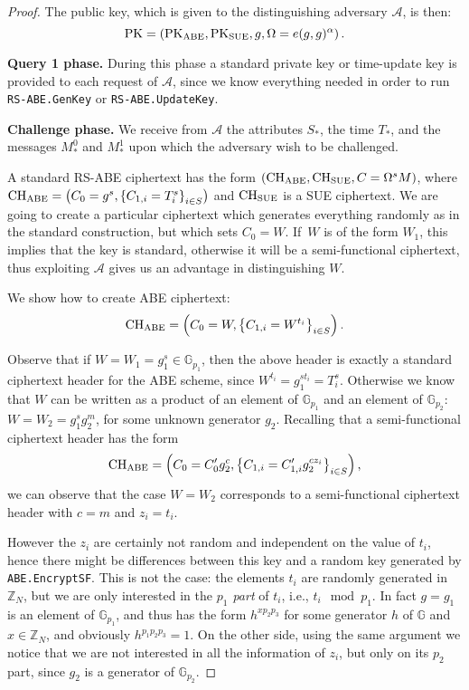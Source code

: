 \documentclass[a4paper,10pt]{article}
\newcommand{\G}{\mathbb{G}}
\newcommand{\Z}{\mathbb{Z}}
\newcommand{\algorithm}[2]{\texttt{#1.#2}}
\newcommand{\phase}[1]{\textbf{#1 phase.} \hspace{0pt}}
\begin{document}
\begin{proof}
	The public key, which is given to the distinguishing adversary $\mathcal{A}$, is then:
	\[
		\mathrm{PK}=\left( \mathrm{PK}_{\textnormal{ABE}}, \mathrm{PK}_{\textnormal{SUE}}, g, \Omega=e(g,g)^\alpha \right).
	\]
	
	\phase{Query 1}
	During this phase a standard private key or time-update key is provided to each request of $\mathcal{A}$, since we know everything needed in order to run \algorithm{RS-ABE}{GenKey} or \algorithm{RS-ABE}{UpdateKey}.
	
	\phase{Challenge}
	We receive from $\mathcal{A}$ the attributes $S_*$, the time $T_*$, and the messages $M_*^0$ and $M_*^1$ upon which the adversary wish to be challenged.
	
	A standard RS-ABE ciphertext has the form $\left( \mathrm{CH}_{\textnormal{ABE}},\mathrm{CH}_{\textnormal{SUE}},C=\Omega^s M \right)$, where $\mathrm{CH}_{\textnormal{ABE}}=\left(C_0=g^s,\left\{C_{1,i}=T_i^s\right\}_{i\in S} \right)$ and $\mathrm{CH}_{\textnormal{SUE}}$ is a SUE ciphertext. We are going to create a particular ciphertext which generates everything randomly as in the standard construction, but which sets $C_0=W$. If~$W$ is of the form $W_1$, this implies that the key is standard, otherwise it will be a semi-functional ciphertext, thus exploiting $\mathcal{A}$ gives us an advantage in distinguishing $W$.
	
	We show how to create ABE ciphertext:
	\[
		\mathrm{CH}_{\textnormal{ABE}}=\left(C_0=W,\left\{C_{1,i}=W^{t_i}\right\}_{i\in S} \right).
	\]
	
	Observe that if $W=W_1=g_1^s\in\G_{p_1}$, then the above header is exactly a standard ciphertext header for the ABE scheme, since $W^{t_i}=g_1^{st_i}=T_i^s$.
	Otherwise we know that $W$ can be written as a product of an element of $\G_{p_1}$ and an element of $\G_{p_2}$: $W=W_2=g_1^sg_2^m$, for some unknown generator $g_2$.
	Recalling that a semi-functional ciphertext header has the form 
	\[
		\mathrm{CH}_{\textnormal{ABE}}=\left(C_0=C^\prime_0 g_2^c,\left\{C_{1,i}=C^\prime_{1,i} g_2^{cz_i} \right\}_{i\in S} \right),
	\]
	we can observe that the case $W=W_2$ corresponds to a semi-functional ciphertext header with $c=m$ and $z_i=t_i$.
	
	However the $z_i$ are certainly not random and independent on the value of $t_i$, hence there might be differences between this key and a random key generated by \algorithm{ABE}{EncryptSF}.
	This is not the case: the elements $t_i$ are randomly generated in $\Z_N$, but we are only interested in the \emph{$p_1$ part} of $t_i$, i.e., $t_i\mod p_1$. In fact $g=g_1$ is an element of $\G_{p_1}$, and thus has the form $h^{x p_2 p_3}$ for some generator $h$ of $\G$ and $x\in\Z_N$, and obviously $h^{p_1 p_2 p_3}=1$.
	On the other side, using the same argument we notice that we are not interested in all the information of $z_i$, but only on its $p_2$ part, since $g_2$ is a generator of $\G_{p_2}$.
	

\end{proof}
\end{document}
